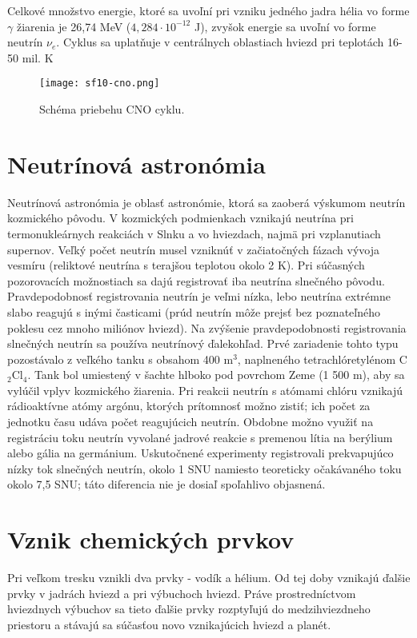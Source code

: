 \documentclass[../../main.tex]{subfiles}
\begin{document}
Celkové množstvo energie, ktoré sa uvoľní pri vzniku jedného jadra hélia vo forme $\gamma$ žiarenia je 26,74 MeV ($4,284\cdot 10^{-12}$ J), zvyšok energie sa uvoľní vo forme neutrín $\nu_e$. Cyklus sa uplatňuje v centrálnych oblastiach hviezd pri teplotách 16-50 mil. K

\begin{figure}[h]
\centering
\texttt{[image: sf10-cno.png]}
\caption{Schéma priebehu CNO cyklu.}
\label{sf10:img:cno}
\end{figure}

\section{Neutrínová astronómia}

Neutrínová astronómia je oblasť astronómie, ktorá sa zaoberá výskumom neutrín kozmického pôvodu. V kozmických podmienkach vznikajú neutrína pri termonukleárnych reakciách v Slnku a vo hviezdach, najmä pri vzplanutiach supernov. Veľký počet neutrín musel vzniknúť v začiatočných fázach vývoja vesmíru (reliktové neutrína s terajšou teplotou okolo 2 K). Pri súčasných pozorovacích možnostiach sa dajú registrovať iba neutrína slnečného pôvodu. Pravdepodobnosť registrovania neutrín je veľmi nízka, lebo neutrína extrémne slabo reagujú s inými časticami (prúd neutrín môže prejsť bez poznateľného poklesu cez mnoho miliónov hviezd). Na zvýšenie pravdepodobnosti registrovania slnečných neutrín sa používa neutrínový ďalekohľad. Prvé zariadenie tohto typu pozostávalo z veľkého tanku s obsahom 400 m$^3$, naplneného tetrachlóretylénom C$_2$Cl$_4$. Tank bol umiestený v šachte hlboko pod povrchom Zeme (1 500 m), aby sa vylúčil vplyv kozmického žiarenia. Pri reakcii neutrín s atómami chlóru vznikajú rádioaktívne atómy argónu, ktorých prítomnosť možno zistiť; ich počet za jednotku času udáva počet reagujúcich neutrín. Obdobne možno využiť na registráciu toku neutrín vyvolané jadrové reakcie s premenou lítia na berýlium alebo gália na germánium. Uskutočnené experimenty registrovali prekvapujúco nízky tok slnečných neutrín, okolo 1 SNU namiesto teoreticky očakávaného toku okolo 7,5 SNU; táto diferencia nie je dosiaľ spoľahlivo objasnená.

\section{Vznik chemických prvkov}

Pri veľkom tresku vznikli dva prvky - vodík a hélium. Od tej doby vznikajú ďalšie prvky v jadrách hviezd a pri výbuchoch hviezd. Práve prostredníctvom hviezdnych výbuchov sa tieto ďalšie prvky rozptyľujú do medzihviezdneho priestoru a stávajú sa súčasťou novo vznikajúcich hviezd a planét.
\end{document}
